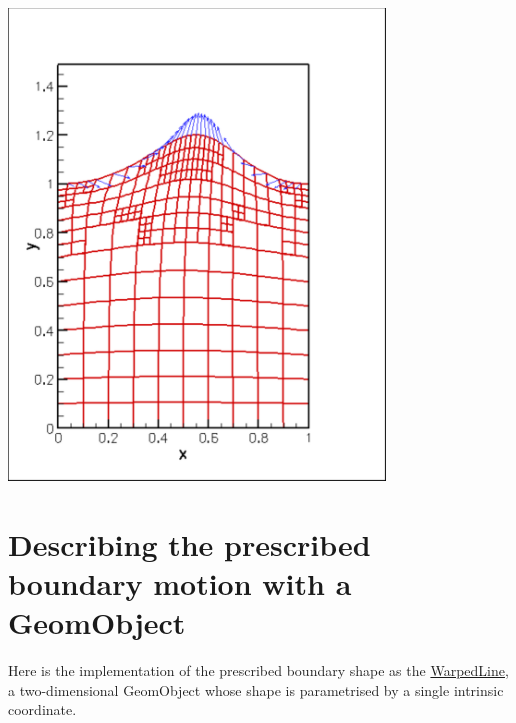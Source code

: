  
\begin{DoxyImage}
\includegraphics[width=0.75\textwidth]{lagr_distort}
\end{DoxyImage}




 

\hypertarget{index_prescribed_boundary}{}\section{Describing the prescribed boundary motion with a Geom\+Object}\label{index_prescribed_boundary}
Here is the implementation of the prescribed boundary shape as the {\ttfamily \hyperlink{classWarpedLine}{Warped\+Line}}, a two-\/dimensional {\ttfamily Geom\+Object} whose shape is parametrised by a single intrinsic coordinate.

